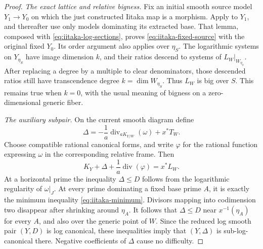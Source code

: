 \begin{proof}
\emph{The exact lattice and relative bigness.}
Fix an initial smooth source model \(Y_1\to Y_0\) on which the just
constructed Iitaka map is a morphism.  Apply
 to \(Y_1\), and thereafter use only
models dominating its extracted base.  That lemma, composed with
\eqref{eq:iitaka-log-sections}, proves
\eqref{eq:iitaka-fixed-source} with the original fixed \(Y_0\).
Its order argument also applies over \(\eta_S\).  The logarithmic
systems on \(Y_{\eta_S}\) have image dimension \(k\), and their
ratios descend to systems of \(L_W|_{W_{\eta_S}}\).  After replacing
a degree by a multiple to clear denominators, those descended ratios
still have transcendence degree \(k=\dim W_{\eta_S}\).  Thus \(L_W\)
is big over \(S\).  This remains true when \(k=0\), with the usual
meaning of bigness on a zero-dimensional generic fiber.

\emph{The auxiliary subpair.}
On the current smooth diagram define
\begin{equation}\label{eq:iitaka-auxiliary-pair}
 \Delta=-\frac1a\operatorname{div}_{aK_{Y/W}}(\omega)+x^*T_W.
\end{equation}
Choose compatible rational canonical forms, and write \(\varphi\) for
the rational function expressing \(\omega\) in the corresponding
relative frame.  Then
\begin{equation}\label{eq:iitaka-trivialization}
 K_Y+\Delta+\frac1a\operatorname{div}(\varphi)=x^*L_W.
\end{equation}
At a horizontal prime the inequality \(\Delta\le D\) follows from
the logarithmic regularity of \(\omega|_J\).  At every prime
dominating a fixed base prime \(A\), it is exactly the minimum
inequality \eqref{eq:iitaka-minimum}.  Divisors mapping into
codimension two disappear after shrinking around \(\eta_A\).
It follows that \(\Delta\le D\) near \(x^{-1}(\eta_A)\) for every
\(A\), and also over the generic point of \(W\).  Since the reduced
log smooth pair \((Y,D)\) is log canonical, these inequalities imply
that \((Y,\Delta)\) is sub-log-canonical there.  Negative coefficients
of \(\Delta\) cause no difficulty.


\end{proof}

